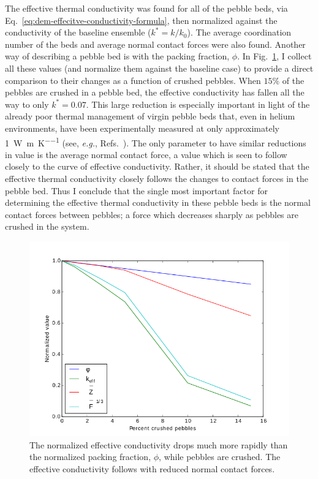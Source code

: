 The effective thermal conductivity was found for all of the pebble beds, via Eq.~\ref{eq:dem-effecitve-conductivity-formula}, then normalized against the conductivity of the baseline ensemble ($k^* = k/k_\text{0}$). The average coordination number of the beds and average normal contact forces were also found. Another way of describing a pebble bed is with the packing fraction, $\phi$. In Fig.~\ref{fig:packing-fraction}, I collect all these values (and normalize them against the baseline case) to provide a direct comparison to their changes as a function of crushed pebbles. When $15\%$ of the pebbles are crushed in a pebble bed, the effective conductivity has fallen all the way to only $k^*=0.07$. This large reduction is especially important in light of the already poor thermal management of virgin pebble beds that, even in helium environments, have been experimentally measured at only approximately \SI{1}{\watt\per\meter\per\kelvin} (see, \textit{ e.g.}, Refs.~\cite{Reimann:2002mi, Piazza2002811}). The only parameter to have similar reductions in value is the average normal contact force, a value which is seen to follow closely to the curve of effective conductivity. Rather, it should be stated that the effective thermal conductivity closely follows the changes to contact forces in the pebble bed. Thus I conclude that the single most important factor for determining the effective thermal conductivity in these pebble beds is the normal contact forces between pebbles; a force which decreases sharply as pebbles are crushed in the system.

\begin{figure}[!ht]
    \centering
    \includegraphics[width=\singleimagewidth]{figures/kEff_packingFraction}
    \caption{The normalized effective conductivity drops much more rapidly than the normalized packing fraction, $\phi$, while pebbles are crushed. The effective conductivity follows with reduced normal contact forces.}
\label{fig:packing-fraction}
\end{figure}

